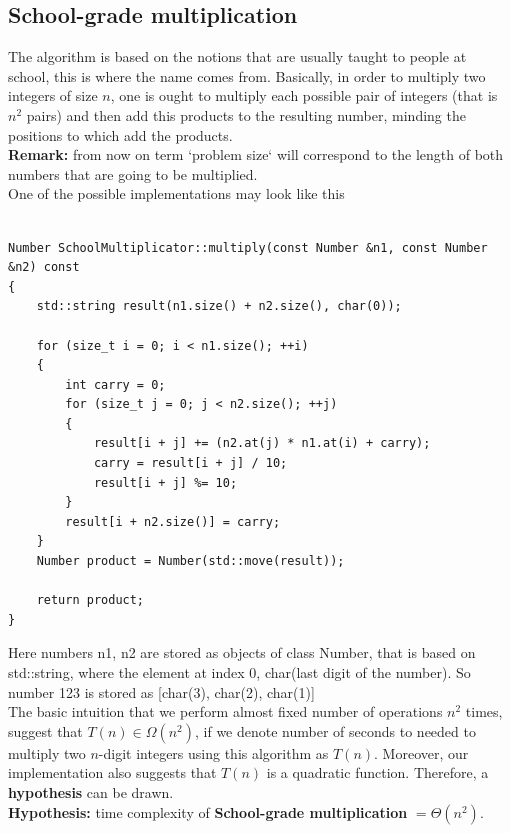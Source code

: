 \documentclass[12pt, oneside]{article}
\newenvironment{code}{\captionsetup{type=listing}}{}
\begin{document}
  \subsection {School-grade multiplication}
  The algorithm is based on the notions that are usually taught to people at school, this is where the name comes from. Basically, in order to multiply two integers of size $n$, one is ought to multiply each possible pair of integers (that is $n^2$ pairs) and then add this products to the resulting number, minding the positions to which add the products.\\ \textbf{Remark: }from now on term `problem size` will correspond to the length of both numbers that are going to be multiplied.
      \vspace{0.3cm}
  \\One of the possible implementations may look like this
  \begin{code}
\begin{verbatim}
 
Number SchoolMultiplicator::multiply(const Number &n1, const Number &n2) const
{
    std::string result(n1.size() + n2.size(), char(0));

    for (size_t i = 0; i < n1.size(); ++i)
    {
        int carry = 0;
        for (size_t j = 0; j < n2.size(); ++j)
        {
            result[i + j] += (n2.at(j) * n1.at(i) + carry);
            carry = result[i + j] / 10;
            result[i + j] %= 10;
        }
        result[i + n2.size()] = carry;
    }
    Number product = Number(std::move(result));

    return product;
}
  \end{verbatim}
    \end{code}
   Here numbers n1, n2 are stored as objects of class Number, that is based on std::string, where the element at index 0, char(last digit of the number). So number 123 is stored as [char(3), char(2), char(1)] 
         \vspace{0.3cm}
   \\
The basic intuition that we perform almost fixed number of operations $n^2$ times, suggest that $T(n) \in \Omega(n^2)$, if we denote number of seconds to needed to multiply two $n$-digit integers using this algorithm as $T(n)$. Moreover, our implementation also suggests that $T(n)$ is a quadratic function. Therefore, a \textbf{hypothesis} can be drawn.
      \vspace{0.5cm}
\\ \textbf{Hypothesis:} time complexity of \textbf{School-grade multiplication} $ =  \Theta(n^2)$. 
\end{document}

